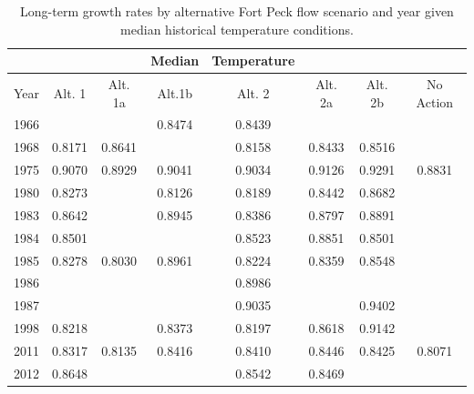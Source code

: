 \documentclass[12pt]{article}
\begin{document}
\newpage


\begin{table}[h]
\caption{Long-term growth rates by alternative Fort Peck flow scenario and year given median historical temperature conditions.}
\centering
\begin{tabular}{cccccccc}		
\hline
&&& \textbf{Median} & \textbf{Temperature} &&&\\
\hline
Year  & Alt. 1 & Alt. 1a & Alt.1b & Alt. 2 & Alt. 2a & Alt. 2b & No Action\\ 
1966	& & & 0.8474 & 0.8439 & & &\\
1968	& 0.8171 & 0.8641	& & 0.8158 & 0.8433 & 0.8516 & \\	
1975	& 0.9070 & 0.8929	& 0.9041 & 0.9034 &  0.9126 & 0.9291 & 0.8831\\
1980	& 0.8273 & & 0.8126 & 0.8189 & 0.8442 & 0.8682 & \\	
1983	& 0.8642 & & 0.8945 & 0.8386& 0.8797 & 0.8891 &\\	
1984	& 0.8501 & & & 0.8523 & 0.8851 & 0.8501 & \\	
1985	& 0.8278 & 0.8030 & 0.8961 & 0.8224 & 0.8359 & 0.8548 & \\	
1986	& & & & 0.8986 & & & \\
1987	& & & & 0.9035 & & 0.9402 & \\
1998	& 0.8218 & & 0.8373 & 0.8197 & 0.8618 & 0.9142 & \\	
2011	& 0.8317 & 0.8135 & 0.8416 & 0.8410 & 0.8446 & 0.8425 & 0.8071\\
2012	& 0.8648 & & & 0.8542 & 0.8469 & &\\	
\hline
\end{tabular}
\end{table}
\end{document}
